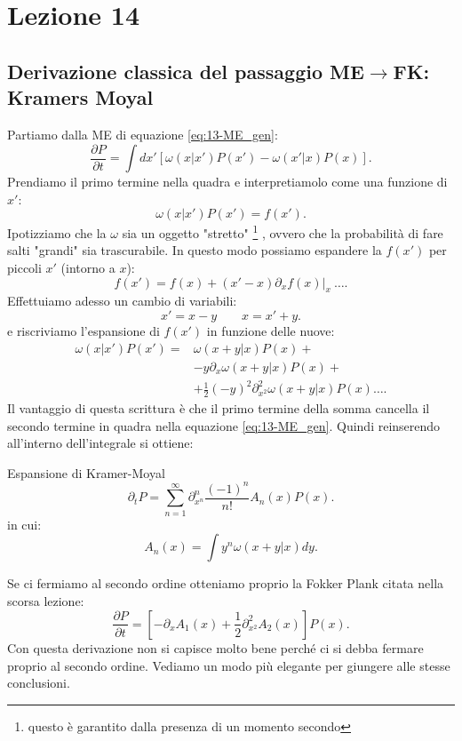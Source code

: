 \section{Lezione 14}%
\label{sub:Lezione 14}
\subsection{Derivazione classica del passaggio ME$\to $FK: Kramers Moyal}%
Partiamo dalla ME di equazione \ref{eq:13-ME_gen}:
\[
    \frac{\partial P}{\partial t} = \int dx' \left[\omega (x|x') P(x') - \omega (x'|x) P(x) \right]
.\] 
Prendiamo il primo termine nella quadra e interpretiamolo come una funzione di $x'$:
\[
    \omega (x|x') P(x') = f(x') 
.\] 
Ipotizziamo che la $\omega$ sia un oggetto "stretto"
\footnote{questo è garantito dalla presenza di un momento secondo}
, ovvero che la probabilità di fare salti "grandi" sia trascurabile. In questo modo possiamo espandere la $f(x')$ per piccoli $x'$ (intorno a $x$):
\[
    f(x')  = f(x) + (x'-x) \left.\partial_{x}f(x) \right|_{x} \ \ldots
.\] 
Effettuiamo adesso un cambio di variabili: 
\[
    x' = x-y \qquad x = x'+y
.\] 
e riscriviamo l'espansione di $f(x')$ in funzione delle nuove:
\[\begin{aligned}
    \omega (x|x') P(x') =& \omega\left(x+y|x\right)P(x) +\\
			 & - y \partial_{x}\omega\left(x+y|x\right)P(x) + \\
			 & + \frac{1}{2}(-y) ^2\partial^2_{x^2}\omega (x+y|x) P(x) \ldots
.\end{aligned}\]
Il vantaggio di questa scrittura è che il primo termine della somma cancella il secondo termine in quadra nella equazione \ref{eq:13-ME_gen}.
Quindi reinserendo all'interno dell'integrale si ottiene:
\begin{redbox}{Espansione di Kramer-Moyal}
 \[
    \partial_{t}P = \sum_{n=1}^{\infty} \partial^n_{x^n} \frac{(-1)^n}{n!} A_n(x) P(x) 
.\]    
in cui:
\[
    A_n(x) = \int  y^n \omega (x+y|x) dy
.\] 
\end{redbox}
\noindent
Se ci fermiamo al secondo ordine otteniamo proprio la Fokker Plank citata nella scorsa lezione:
\[
    \frac{\partial P}{\partial t} = \left[-\partial_{x}A_1(x) + \frac{1}{2}\partial^2_{x^2} A_2(x) \right]P(x) 
.\] 
Con questa derivazione non si capisce molto bene perché ci si debba fermare proprio al secondo ordine. Vediamo un modo più elegante per giungere alle stesse conclusioni.
